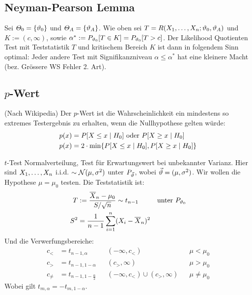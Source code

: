 \subsection{Neyman-Pearson Lemma}
Sei $\varTheta_0 = \{\vartheta_0\}$ und $\varTheta_A = \{\vartheta_A\}$. Wie oben sei $T =
  R (X_1, \dots, X_n; \vartheta_0, \vartheta_A)$ und $K := (c, \infty)$, sowie $\alpha^* :=
  P_{\vartheta_0}[T \in K] = P_{\vartheta_0}[T > c]$. Der Likelihood Quotienten Test mit
Teststatistik $T$ und kritischem Bereich $K$ ist dann in folgendem Sinn
optimal: Jeder andere Test mit Signifikanzniveau $\alpha \leq \alpha^*$ hat
eine kleinere Macht (bez. Grössere WS Fehler 2. Art).
\subsection{$p$-Wert}
(Nach Wikipedia) Der $p$-Wert ist die Wahrscheinlichkeit ein mindestens
so extremes Testergebnis zu erhalten, wenn die Nullhypothese gelten würde:
\begin{align*}
  p (x) & = P[X \leq x \; | \; H_0] \text{   oder   } P[X \geq x \; | \; H_0]   \\
  p (x) & = 2 \cdot \min \{ P[X \leq x \; | \; H_0], P[X \geq x \; | \; H_0] \}
\end{align*}
\begin{definition}{$t$-Test}
  \color{red} Normalverteilung, Test für Erwartungswert bei unbekannter Varianz. \color{black} Hier sind
  $X_1, \dots, X_n$ i.i.d. $\sim \mathcal{N} (\mu, \sigma^2)$ unter $P_{\vec{\vartheta}}$, wobei
  $\vec{\vartheta} = (\mu, \sigma^2)$. Wir wollen die Hypothese $\mu = \mu_0$ testen.
  Die Teststatistik ist:
  \begin{align*}
    T   & := \frac{\overline{X}_n - \mu_0}{S / \sqrt{n}} \sim t_{n-1}
        &                                                             & \text{unter } P_{\vartheta_0} \\
    S^2 & = \frac{1}{n-1} \sum_{i = 1}^n  (X_i - \overline{X}_n)^2
  \end{align*}
  Und die Verwerfungsbereiche:
  \begin{align*}
    c_<      & = t_{n-1, \alpha}               &  & (-\infty, c_<)                     &  & \mu < \mu_0    \\
    c_>      & = t_{n-1, 1 - \alpha}           &  & (c_>, \infty)                      &  & \mu > \mu_0    \\
    c_{\neq} & = t_{n-1, 1 - \frac{\alpha}{2}} &  & (-\infty, c_<) \cup  (c_>, \infty) &  & \mu \neq \mu_0
  \end{align*}
  Wobei gilt $t_{m, \alpha} = -t_{m, 1 - \alpha}$.
  \end{definition}
